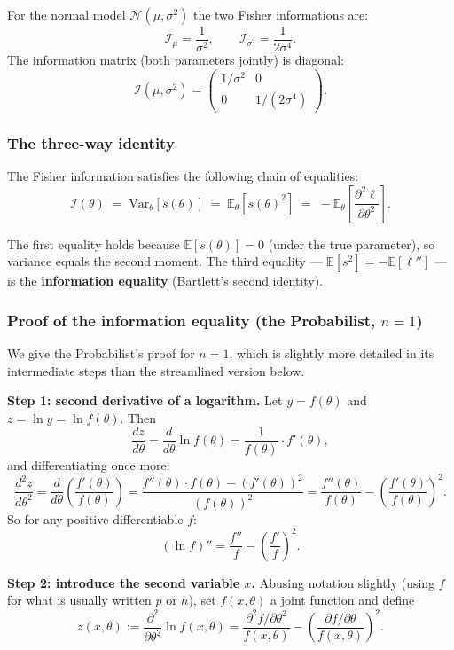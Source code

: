 \documentclass[a4paper,oneside,12pt]{extarticle}
\theoremstyle{plain}
\theoremstyle{definition}
\theoremstyle{remark}
\newcommand*{\E}{\mathbb{E}}
\newcommand*{\Var}{\mathrm{Var}}
\begin{document}
For the normal model $\mathcal{N}(\mu,\sigma^2)$ the two Fisher
informations are:
\[
  \mathcal{I}_\mu = \frac{1}{\sigma^2},
  \qquad
  \mathcal{I}_{\sigma^2} = \frac{1}{2\sigma^4}.
\]
The information matrix (both parameters jointly) is diagonal:
\[
  \mathcal{I}(\mu,\sigma^2) =
  \begin{pmatrix} 1/\sigma^2 & 0 \\ 0 & 1/(2\sigma^4) \end{pmatrix}.
\]

\subsubsection{The three-way identity}

The Fisher information satisfies the following chain of equalities:
\[
  \mathcal{I}(\theta)
  \;=\; \Var_\theta[s(\theta)]
  \;=\; \E_\theta\!\left[s(\theta)^2\right]
  \;=\; -\E_\theta\!\left[\frac{\partial^2 \ell}{\partial\theta^2}\right].
\]

The first equality holds because $\E[s(\theta)]=0$ (under the true
parameter), so variance equals the second moment.
The third equality --- $\E[s^2] = -\E[\ell'']$ --- is the
\textbf{information equality} (Bartlett's second identity).

\subsubsection{Proof of the information equality (the Probabilist, $n=1$)}

We give the Probabilist's proof for $n=1$, which is slightly more detailed in
its intermediate steps than the streamlined version below.

\medskip
\noindent\textbf{Step 1: second derivative of a logarithm.}
Let $y=f(\theta)$ and $z=\ln y = \ln f(\theta)$.  Then
\[
  \frac{dz}{d\theta}
  = \frac{d}{d\theta}\ln f(\theta)
  = \frac{1}{f(\theta)}\cdot f'(\theta),
\]
and differentiating once more:
\[
  \frac{d^2z}{d\theta^2}
  = \frac{d}{d\theta}\!\left(\frac{f'(\theta)}{f(\theta)}\right)
  = \frac{f''(\theta)\cdot f(\theta) - (f'(\theta))^2}{(f(\theta))^2}
  = \frac{f''(\theta)}{f(\theta)} - \left(\frac{f'(\theta)}{f(\theta)}\right)^{\!2}.
\]
So for any positive differentiable $f$:
\[
  (\ln f)'' = \frac{f''}{f} - \left(\frac{f'}{f}\right)^{\!2}.
  \tag{$*$}
\]

\medskip
\noindent\textbf{Step 2: introduce the second variable $x$.}
Abusing notation slightly (using $f$ for what is usually written $p$
or $h$), set $f(x,\theta)$ a joint function and define
\[
  z(x,\theta) := \frac{\partial^2}{\partial\theta^2}\ln f(x,\theta)
  = \frac{\partial^2 f/\partial\theta^2}{f(x,\theta)}
    - \left(\frac{\partial f/\partial\theta}{f(x,\theta)}\right)^{\!2}.
\]
\end{document}
